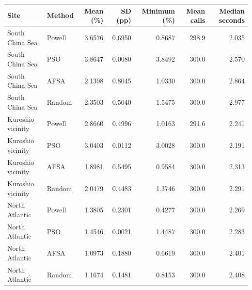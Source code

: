 \begin{tabular}{llrrrrr}
\toprule
Site & Method & Mean (\%) & SD (pp) & Minimum (\%) & Mean calls & Median seconds \\
\midrule
South China Sea & Powell & 3.6576 & 0.6950 & 0.8687 & 298.9 & 2.035 \\
South China Sea & PSO & 3.8647 & 0.0080 & 3.8492 & 300.0 & 2.570 \\
South China Sea & AFSA & 2.1398 & 0.8045 & 1.0330 & 300.0 & 2.864 \\
South China Sea & Random & 2.3503 & 0.5040 & 1.5475 & 300.0 & 2.977 \\
Kuroshio vicinity & Powell & 2.8660 & 0.4996 & 1.0163 & 291.6 & 2.241 \\
Kuroshio vicinity & PSO & 3.0403 & 0.0112 & 3.0028 & 300.0 & 2.191 \\
Kuroshio vicinity & AFSA & 1.8981 & 0.5495 & 0.9584 & 300.0 & 2.313 \\
Kuroshio vicinity & Random & 2.0479 & 0.4483 & 1.3746 & 300.0 & 2.291 \\
North Atlantic & Powell & 1.3805 & 0.2301 & 0.4277 & 300.0 & 2.269 \\
North Atlantic & PSO & 1.4546 & 0.0021 & 1.4487 & 300.0 & 2.283 \\
North Atlantic & AFSA & 1.0973 & 0.1880 & 0.6619 & 300.0 & 2.401 \\
North Atlantic & Random & 1.1674 & 0.1481 & 0.8153 & 300.0 & 2.408 \\
\bottomrule
\end{tabular}
